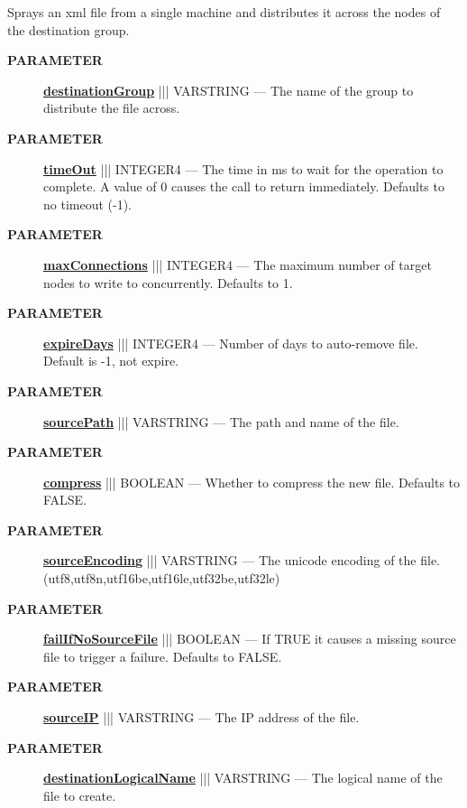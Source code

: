 \par





Sprays an xml file from a single machine and distributes it across the nodes of the destination group.






\par
\begin{description}
\item [\colorbox{tagtype}{\color{white} \textbf{\textsf{PARAMETER}}}] \textbf{\underline{destinationGroup}} ||| VARSTRING --- The name of the group to distribute the file across.
\item [\colorbox{tagtype}{\color{white} \textbf{\textsf{PARAMETER}}}] \textbf{\underline{timeOut}} ||| INTEGER4 --- The time in ms to wait for the operation to complete. A value of 0 causes the call to return immediately. Defaults to no timeout (-1).
\item [\colorbox{tagtype}{\color{white} \textbf{\textsf{PARAMETER}}}] \textbf{\underline{maxConnections}} ||| INTEGER4 --- The maximum number of target nodes to write to concurrently. Defaults to 1.
\item [\colorbox{tagtype}{\color{white} \textbf{\textsf{PARAMETER}}}] \textbf{\underline{expireDays}} ||| INTEGER4 --- Number of days to auto-remove file. Default is -1, not expire.
\item [\colorbox{tagtype}{\color{white} \textbf{\textsf{PARAMETER}}}] \textbf{\underline{sourcePath}} ||| VARSTRING --- The path and name of the file.
\item [\colorbox{tagtype}{\color{white} \textbf{\textsf{PARAMETER}}}] \textbf{\underline{compress}} ||| BOOLEAN --- Whether to compress the new file. Defaults to FALSE.
\item [\colorbox{tagtype}{\color{white} \textbf{\textsf{PARAMETER}}}] \textbf{\underline{sourceEncoding}} ||| VARSTRING --- The unicode encoding of the file. (utf8,utf8n,utf16be,utf16le,utf32be,utf32le)
\item [\colorbox{tagtype}{\color{white} \textbf{\textsf{PARAMETER}}}] \textbf{\underline{failIfNoSourceFile}} ||| BOOLEAN --- If TRUE it causes a missing source file to trigger a failure. Defaults to FALSE.
\item [\colorbox{tagtype}{\color{white} \textbf{\textsf{PARAMETER}}}] \textbf{\underline{sourceIP}} ||| VARSTRING --- The IP address of the file.
\item [\colorbox{tagtype}{\color{white} \textbf{\textsf{PARAMETER}}}] \textbf{\underline{destinationLogicalName}} ||| VARSTRING --- The logical name of the file to create.

\end{description}
